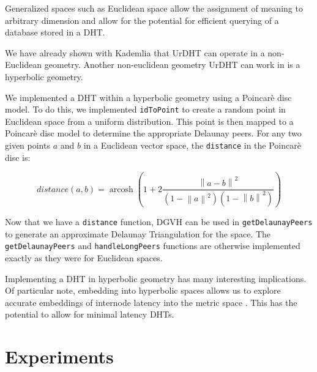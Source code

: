 \documentclass[11pt,conference]{IEEEtran}
\begin{document}
Generalized spaces such as Euclidean space allow the assignment of meaning to arbitrary dimension and allow for the potential for efficient querying of a database stored in a DHT.

	
\label{sec:hyper}

We have already shown with Kademlia that UrDHT can operate in a non-Euclidean geometry.
Another non-euclidean geometry UrDHT can work in is a hyperbolic geometry.

We implemented a DHT within a hyperbolic geometry using a Poincar\`{e} disc model.
To do this, we implemented \texttt{idToPoint} to create a random point in Euclidean space from a uniform distribution.
This point is then mapped to a Poincar\`{e} disc model to determine the appropriate Delaunay peers.
For any two given points $a$ and $b$ in a Euclidean vector space, the \texttt{distance} in the  Poincar\`{e} disc is:


\[ distance(a, b) = \operatorname{arcosh} \left(  1+ 2 \frac{ \left\| a - b \right\| ^{2} }{ ( 1 - \left\| a \right\| ^{2} ) ( 1 - \left\| b \right\| ^{2} ) }\right) \]


Now that we have a \texttt{distance} function, DGVH can be used in \texttt{getDelaunayPeers} to generate an approximate Delaunay Triangulation for the space.
The \texttt{getDelaunayPeers} and \texttt{handleLongPeers} functions are otherwise implemented exactly as they were for Euclidean spaces. 




Implementing a DHT in hyperbolic geometry has many interesting implications.
Of particular note, embedding into hyperbolic spaces allows us to explore accurate embeddings of internode latency into the metric space \cite{kleinberg2007geographic} \cite{cvetkovski2009hyperbolic}.
This has the potential to allow for minimal latency DHTs.


%
%
%	
\section{Experiments}
\label{sec:experiments}
\end{document}

